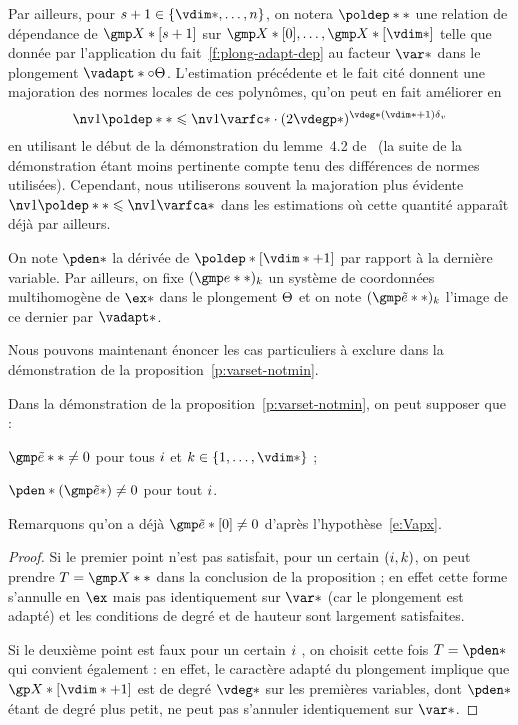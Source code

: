 Par ailleurs, pour \( \indi \in \set{\vdim*, \dots, \dimp} \), on notera \(
  \poldep** \) \label{p:def-poldep} une relation de dépendance de \(
  \vmp*[\indi] \) sur \(
  \vmp*[0], \dots, \vmp*[\vdim*] \) telle que donnée par l'application du
fait~\ref{f:plong-adapt-dep} au facteur \( \var* \) dans le plongement \(
  \vadapt* \circ \vaemb \). L'estimation précédente et le fait cité donnent
une majoration des normes locales de ces polynômes, qu'on peut en fait
améliorer en
\begin{equation} \label{e:nv-poldep}
  \nv1{\poldep**} \le \nv1{\varfc*}
  \cdot ( 2 \vdegp* )^{\vdeg* (\vdim* + 1) \dv}
\end{equation}
en utilisant le début de la démonstration du lemme~4.2 de~\cite{remivds} (la
suite de la démonstration étant moins pertinente compte tenu des différences
de normes utilisées). Cependant, nous utiliserons souvent la majoration plus
évidente \( \nv1{\poldep**} \le \nv1{\varfca*} \) dans les estimations où
cette quantité apparaît déjà par ailleurs.

\begin{nota} \label{n:pden-cexa}
  On note \( \pden* \) la dérivée de \( \poldep*[\vdim*+1] \) par rapport à la
  dernière variable.  Par ailleurs, on fixe \( (\cex**)_\ind \) un système de
  coordonnées multihomogène de \( \ex* \) dans le plongement \( \Theta \) et
  on note \( (\cexa**)_\ind \) l'image de ce dernier par \( \vadapt* \).
\end{nota}

Nous pouvons maintenant énoncer les cas particuliers à exclure dans la
démonstration de la proposition~\ref{p:varset-notmin}.

\begin{scho} \label{s:part-cases}
  Dans la démonstration de la proposition~\ref{p:varset-notmin}, on peut
  supposer que :
  \begin{enumthm}
    \item \( \cexa** \neq 0 \) pour tous \( i \) et \( \ind \in \set{1,
          \dots, \vdim*} \) ;
    \item \( \pden*(\cexa*) \neq 0 \) pour tout \( i \).
  \end{enumthm}
  Remarquons qu'on a déjà \( \cexa*[0] \neq 0 \) d'après
  l'hypothèse~\eqref{e:Vapx}.
\end{scho}

\begin{proof}
  Si le premier point n'est pas satisfait, pour un certain \( (i, k) \),
  on peut prendre \( T = \vmp** \) dans la conclusion de la
  proposition ; en effet cette forme s'annulle en \( \ex \) mais pas
  identiquement sur \( \var* \) (car le plongement est adapté) et les
  conditions de degré et de hauteur sont largement satisfaites.

  Si le deuxième point est faux pour un certain \( i \) , on choisit cette
  fois \( T = \pden* \) qui convient également : en effet, le caractère adapté
  du plongement implique que \( \vp*[\vdim*+1] \) est de degré \( \vdeg* \)
  sur les premières variables, dont \( \pden* \) étant de degré plus petit, ne
  peut pas s'annuler identiquement sur \( \var* \).
\end{proof}

